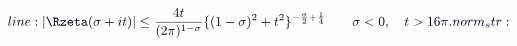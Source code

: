 \documentclass[12pt]{article}
\begin{document}
\makeatletter
\renewcommand*{\@textcolor}[3]{%
  \protect\leavevmode
  \begingroup
    \color#1{#2}#3%
  \endgroup
}
\makeatother
\begin{displaymath}
\mathcolor[RGB]{0,0,15}{line:
|\Rzeta(\sigma+it)|\le\frac{4t}{(2\pi)^{1-\sigma}}\{(1-\sigma)^2+t^2\}^{-\frac{\sigma}{2}+\frac{1}{4}}\qquad\sigma<0,\quad} \mathcolor[RGB]{0,0,30}{t>16\pi.

norm_str:}
\end{displaymath}
\end{document}
